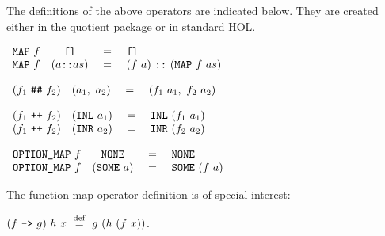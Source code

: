 \documentclass[envcountsame,runningheads]{llncs}
\def\defeq{\stackrel{\mathrm{def}}{=}}
\begin{document}
\noindent
The definitions of the above operators are indicated below. 
They are created either in the quotient package or in standard HOL. 

\begin{definition}
\label{listmap}
$\begin{array}[t]{lccl}
\mbox{\tt MAP}\ f & \mbox{\tt []} & \ = \  & \mbox{\tt []} \\
\mbox{\tt MAP}\ f & (a \mbox{\tt ::} as) & \ = \ 
   & (f\ a)\ \mbox{\tt ::}\ (\mbox{\tt MAP}\ f\ as)
\end{array}$
\end{definition}

\begin{definition}
\label{pairmap}
$\begin{array}[t]{lccl}
(f_1\ \mbox{\tt \#\#}\ f_2) & (a_1, \ a_2) & \ = \ 
   & (f_1\ a_1, \ f_2\ a_2)
\end{array}$
\end{definition}

\begin{definition}
\label{summap}
$\begin{array}[t]{lccl}
(f_1\ \mbox{\tt ++}\ f_2) & (\mbox{\tt INL}\ a_1) & \ = \ 
   & \mbox{\tt INL}\ (f_1\ a_1)  \\
(f_1\ \mbox{\tt ++}\ f_2) & (\mbox{\tt INR}\ a_2) & \ = \ 
   & \mbox{\tt INR}\ (f_2\ a_2)  
\end{array}$
\end{definition}

\begin{definition}
\label{optionmap}
$\begin{array}[t]{lccl}
\mbox{\tt OPTION\_MAP}\ f & \mbox{\tt NONE} & \ = \ 
   & \mbox{\tt NONE}  \\
\mbox{\tt OPTION\_MAP}\ f & (\mbox{\tt SOME}\ a) & \ = \ 
   & \mbox{\tt SOME}\ (f\ a)
\end{array}$
\end{definition}

The
function map operator definition is of special interest:

\begin{definition}
\label{funmap}
$(f\ \mbox{\tt -->}\ g)\ h\ x \ \defeq \ 
g\ (h\ (f\ x))$.
\end{definition}
\end{document}
